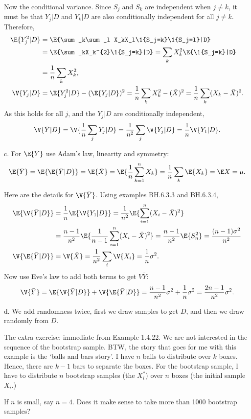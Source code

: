 \begin{exercise}
\begin{solution}
Now the conditional variance. Since $S_j$ and $S_k$ are independent when $j\neq k$, it must be that $Y_j|D$ and $Y_k|D$ are also conditionally independent for all $j\neq k$. Therefore,
\begin{align*}
\E{Y_{j}^{2}|D}
&= \E{\sum_k\sum_l X_kX_l\1{S_j=k}\1{S_j=l}|D} \\
&= \E{\sum_kX_k^{2}\1{S_j=k}|D}  = \sum_kX_k^{2}\E{\1{S_j=k}|D} \\
&= \frac 1 n \sum_{k} X_k^{2}, \\
\V{Y_j| D} &= \E{Y_j^2|D} - (\E{Y_j|D})^{2} = \frac 1 n \sum_{k} X_k^{2} - (\bar X)^{2} = \frac 1 n \sum_{k} (X_k - \bar X)^{2}.
\end{align*}
As this holds for all $j$, and the $Y_{j}|D$ are conditionally independent,
\begin{align*}
\V{\bar Y|D}
=\V{\frac 1 n\sum_{j}Y_{j}|D} = \frac 1{n^{2}} \sum_j \V{Y_j|D} = \frac 1 n \V{Y_1|D}.
\end{align*}


c. For $\E{\bar Y}$ use Adam's law, linearity and symmetry:
\begin{align*}
\E{\bar Y} = \E{\E{\bar Y|D}} = \E{\bar X} = \E{\frac 1 n \sum_{k=1}^{n}X_{k}} =  \frac 1 n \sum_{k}\E{X_{k}} = \E X = \mu.
\end{align*}


Here are the details for $\V{\bar Y}$. Using  examples BH.6.3.3 and BH.6.3.4,
\begin{align*}
\E{\V{\bar Y|D}} &=  \frac 1 n \E{\V{Y_{1}|D}} =
\frac 1 {n^2} \E{ \sum_{i=1}^n (X_i-\bar X)^2} \\
&= \frac{n-1} {n^2} \E{\frac 1 {n-1} \sum_{i=1}^n (X_i-\bar X)^2}
= \frac{n-1} {n^2} \E{S_{n}^2} = \frac{(n-1)\sigma^{2}} {n^2} \\
\V{\E{\bar Y|D}} &= \V{\bar X}= \frac 1{n^{2}} \sum_{i} \V{X_{i}} = \frac 1 n \sigma^{2}.
\end{align*}
Now use Eve's law to add both terms to get $V{\bar Y}$:
\begin{align}
  \V{\bar Y} = \E{\V{\bar Y|D}} + \V{\E{\bar Y|D}} = \frac{n-1}{n^{2}}\sigma^2 + \frac{1}{n} \sigma^2 = \frac{2n-1}{n^{2}}\sigma^{2}.
\end{align}


d. We add randomness twice, first we draw  samples to get $D$, and then we draw randomly from $D$.

The extra exercise: immediate from Example 1.4.22. We are not interested in the sequence of the bootstrap sample. BTW, the story that goes for me with this example is the `balls and bars story'. I have $n$ balls to distribute over $k$ boxes. Hence, there are $k-1$ bars to separate the boxes. For the bootstrap sample, I have to distribute $n$ bootstrap samples (the $X^*_{i}$) over $n$ boxes (the initial sample $X_i$.)

If $n$ is small, say $n=4$. Does it make sense to take more than 1000 bootstrap samples?
\end{solution}
\end{exercise}

